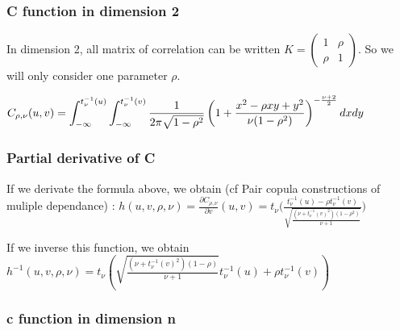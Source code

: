 \documentclass{article}
\begin{document}
\subsubsection{C function in dimension 2}

 	In dimension 2, all matrix of correlation can be written \begin{math} K =
 \begin{pmatrix}
  1 & \rho \\
  \rho & 1
 \end{pmatrix}
\end{math}. So we will only consider one parameter \begin{math} \rho \end{math}.\newline
\newline

\begin{math}
	C_{\rho,\nu} (u,v) = \mathlarger{\int_{-\infty}^{t_\nu^{-1}(u)}\int_{-\infty}^{t_\nu^{-1}(v)} \frac{1}{2\pi\sqrt{1-\rho^{2}}}\left(1+\frac{x^2 -\rho x y + y^2}{\nu (1-\rho^2)}\right)^{-\frac{\nu +2}{2}}dx dy}
\end{math}
\newline


\subsubsection{Partial derivative of C}


If we derivate the formula above, we obtain (cf Pair copula constructions of muliple dependance) : \newline
\begin{math}
h(u,v,\rho,\nu)=\frac{\partial C_{\rho,\nu}}{\partial v} (u,v) = t_\nu \bigg(\frac{t_\nu^{-1}(u)-\rho t_\nu^{-1}(v)}{\sqrt{\frac{(\nu+t_\nu^{-1}(v)^2)(1-\rho ^2)}{\nu+1}}}\bigg)
\end{math}

If we inverse this function, we obtain\newline
\newline
\begin{math}
h^{-1}(u,v,\rho,\nu) = t_\nu (\sqrt{\frac{(\nu+t_\nu^{-1}(v)^2)(1-\rho)}{\nu+1}}t_\nu^{-1}(u)+\rho t_\nu^{-1}(v))
\end{math}


	\subsubsection{c function in dimension n}
\end{document}
